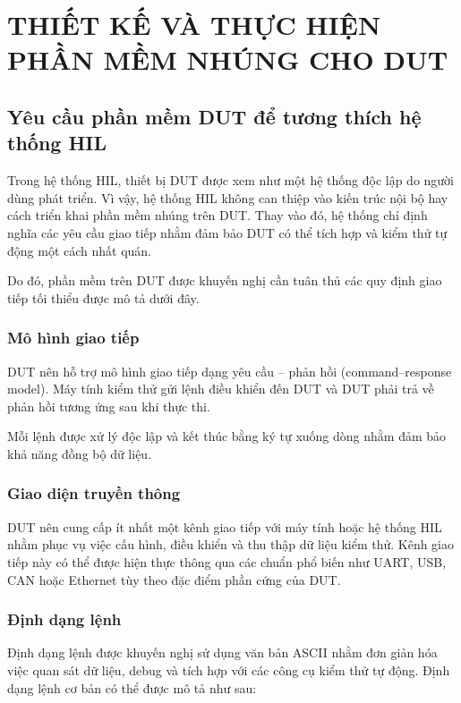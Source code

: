 \chapter{THIẾT KẾ VÀ THỰC HIỆN PHẦN MỀM NHÚNG CHO DUT}
\section{Yêu cầu phần mềm DUT để tương thích hệ thống HIL}

Trong hệ thống HIL, thiết bị DUT được xem như một hệ thống độc lập do người dùng phát triển. Vì vậy, hệ thống HIL không can thiệp vào kiến trúc nội bộ hay cách triển khai phần mềm nhúng trên DUT. Thay vào đó, hệ thống chỉ định nghĩa các yêu cầu giao tiếp nhằm đảm bảo DUT có thể tích hợp và kiểm thử tự động một cách nhất quán.

Do đó, phần mềm trên DUT được khuyến nghị cần tuân thủ các quy định giao tiếp tối thiểu được mô tả dưới đây.

\subsection{Mô hình giao tiếp}

DUT nên hỗ trợ mô hình giao tiếp dạng yêu cầu – phản hồi (command–response model). Máy tính kiểm thử gửi lệnh điều khiển đến DUT và DUT phải trả về phản hồi tương ứng sau khi thực thi.

Mỗi lệnh được xử lý độc lập và kết thúc bằng ký tự xuống dòng nhằm đảm bảo khả năng đồng bộ dữ liệu.

\subsection{Giao diện truyền thông}

DUT nên cung cấp ít nhất một kênh giao tiếp với máy tính hoặc hệ thống HIL nhằm phục vụ việc cấu hình, điều khiển và thu thập dữ liệu kiểm thử. 
Kênh giao tiếp này có thể được hiện thực thông qua các chuẩn phổ biến như UART, USB, CAN hoặc Ethernet tùy theo đặc điểm phần cứng của DUT.

\subsection{Định dạng lệnh}

Định dạng lệnh được khuyến nghị sử dụng văn bản ASCII nhằm đơn giản hóa việc quan sát dữ liệu, debug và tích hợp với các công cụ kiểm thử tự động. Định dạng lệnh cơ bản có thể được mô tả như sau:

